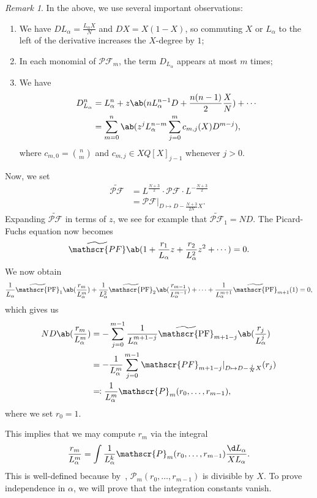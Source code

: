 \documentclass[10pt]{amsart}
\theoremstyle{definition}
\theoremstyle{remark}
\newtheorem{rmk}[thm]{Remark}
\theoremstyle{plain}
\theoremstyle{definition}
\theoremstyle{remark}
\newcommand{\msc}[1]{\mathscr{#1}}
\newcommand{\wt}[1]{\widetilde{#1}}
\newcommand{\1}{\mathbf{1}}
\newcommand{\2}{\mathbf{2}}
\newcommand{\3}{\mathbf{3}}
\DeclareMathOperator{\PF}{\msc{PF}}
\numberwithin{equation}{section}
\begin{document}
\begin{rmk}\label{rmk:derivatives}
    In the above, we use several important observations:
    \begin{enumerate}
        \item We have $DL_{\alpha} = \frac{L_{\alpha}X}{N}$ and $DX = X(1-X)$, so commuting $X$ or $L_{\alpha}$ to the left of the derivative increases the $X$-degree by $1$;
        \item In each monomial of $\msc{PF}_m$, the term $D_{L_{\alpha}}$ appears at most $m$ times;
        \item We have
            \begin{align*}
                D_{L_{\alpha}}^n &= L_{\alpha}^n + z \ab(nL_{\alpha}^{n-1}D + \frac{n(n-1)}{2} \frac{X}{N}) + \cdots \\
                &= \sum_{m=0}^n\ab( z^j L_{\alpha}^{n-m} \sum_{j=0}^m c_{m,j}(X)D^{m-j}),
            \end{align*}
            where $c_{m,0} = \binom{n}{m}$ and $c_{m,j} \in XQ[X]_{j-1}$ whenever $j > 0$.
    \end{enumerate}
\end{rmk}


Now, we set
\begin{align*}
  \wt{\msc{PF}} &= L^{\frac{N+3}{2}} \cdot \msc{PF}\cdot L^{-\frac{N+3}{2}} \\
  &= \msc{PF}|_{D \mapsto D - \frac{N+3}{2N} X}.
\end{align*}
Expanding $\wt{\msc{PF}}$ in terms of $z$, we see for example that $\wt{\msc{PF}}_1 = ND$. The Picard-Fuchs equation now becomes
\[ \wt{\msc{PF}} \ab(1 + \frac{r_1}{L_{\alpha}}z + \frac{r_2}{L_{\alpha}^2} z^2 + \cdots) = 0. \]
We now obtain
\[ \frac{1}{L_{\alpha}} \wt{\PF}_1 \ab(\frac{r_m}{L_{\alpha}^m}) + \frac{1}{L_{\alpha}^2} \wt{\PF}_2\ab(\frac{r_{m-1}}{L_{\alpha}^{m-1}}) + \cdots + \frac{1}{L_{\alpha}^{m+1}} \wt{\PF}_{m+1}(1) = 0, \]
which gives us
\begin{align*}
  ND \ab(\frac{r_m}{L_{\alpha}^m}) &= - \sum_{j=0}^{m-1} \frac{1}{L_{\alpha}^{m+1-j}} \wt{\PF}_{m+1-j} \ab(\frac{r_j}{L_{\alpha}^j}) \\
                              &= -\frac{1}{L_{\alpha}^m} \sum_{j=0}^{m-1} \msc{PF}_{m+1-j}|_{D \mapsto D-\frac{j}{N}X}(r_j) \\
  &\eqqcolon \frac{1}{L_{\alpha}^m}\msc{P}_m(r_0, \ldots, r_{m-1}),
\end{align*}
where we set $r_0 = 1$.


This implies that we may compute $r_m$ via the integral
\[ \frac{r_m}{L_{\alpha}^m} = \int \frac{1}{L_{\alpha}^k} \msc{P}_m(r_0, \ldots, r_{m-1}) \frac{\d L_{\alpha}}{X L_{\alpha}}. \]
This is well-defined because by~\cite[Equation 6.11]{nmsp2}, $\msc{P}_m(r_0, \ldots, r_{m-1})$ is divisible by $X$. To prove independence in $\alpha$, we will prove that the integration constants vanish.
\end{document}
